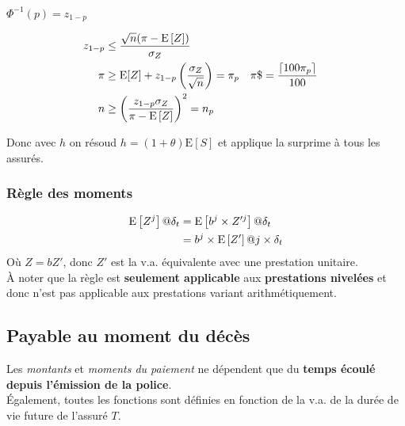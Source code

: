 \documentclass[10pt, french]{article}
\begin{document}
\begin{multicols*}{3}

$\Phi^{-1}(p) = z_{1 - p}$

\begin{align*}
	z_{1 - p} 
	&\le	\frac{\sqrt{n} ( \pi - \mathrm{E} \left[ Z \right])}{\sigma_{Z}}\\
	\pi 
	&\ge	\text{E}[Z] + z_{1 - p} \left(\frac{\sigma_{Z}}{\sqrt{n}}\right) 
	=	\pi_p &
	\pi\$ 
	&=	\frac{\lceil 100 \pi_p \rceil}{100} \\
	n &\ge \left(\frac{z_{1 - p}\sigma_{Z}}{\pi - \mathrm{E} \left[ Z \right]}\right)^2 
	=	n_{p} 
\end{align*} 

Donc avec $h$ on résoud $h = (1 + \theta) \text{E}[S]$ et applique la surprime à tous les assurés.



\subsubsection*{Règle des moments}
\begin{align*}
	\mathrm{E} \left[ Z^{j} \right]@\delta_{t} 
	&=	\mathrm{E} \left[ b^{j} \times Z'^{j} \right]@\delta_{t} \\
	&=	b^{j} \times \mathrm{E} \left[ Z' \right]@ j \times \delta_{t}
\end{align*}
Où $Z = bZ'$, donc $Z'$ est la v.a. équivalente avec une prestation unitaire.\\
À noter que la règle est \textbf{seulement applicable} aux \textbf{prestations nivelées} et donc n'est pas applicable aux prestations variant arithmétiquement.


\columnbreak
\subsection{Payable au moment du décès}
\begin{rappel_enhanced}[Contexte]
Les \textit{montants} et \textit{moments du paiement} ne dépendent que du \textbf{temps écoulé depuis l'émission de la police}.	\\
Également, toutes les fonctions sont définies en fonction de la v.a. de la durée de vie future de l'assuré $T$.
\end{rappel_enhanced}




\end{multicols*}
\end{document}
